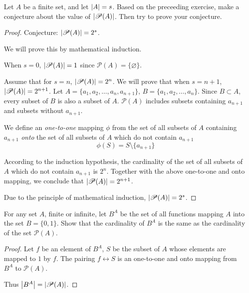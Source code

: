 \begin{exercise}
    Let $A$ be a finite set, and let $\left\vert{A}\right\vert = s$. Based on the preceeding exercise, make a conjecture about the value of $\left\vert{\mathscr{P}(A)}\right\vert$. Then try to prove your conjecture.
\end{exercise}

\begin{proof}
    Conjecture: $\left\vert{\mathscr{P}(A)}\right\vert = {2}^{s}$.

    We will prove this by mathematical induction.

    When $s = 0$, $\left\vert{\mathscr{P}(A)}\right\vert = 1$ since $\mathscr{P}(A) = \{ \varnothing \}$.

    Assume that for $s = n$, $\left\vert{\mathscr{P}(A)}\right\vert = {2}^{n}$. We will prove that when $s = n+1$, $\left\vert{\mathscr{P}(A)}\right\vert = {2}^{n+1}$. Let $A = \{ a_{1}, a_{2}, \ldots, a_{n}, a_{n+1} \}$, $B = \{ a_{1}, a_{2}, \ldots, a_{n} \}$. Since $B\subset A$, every subset of $B$ is also a subset of $A$. $\mathscr{P}(A)$ includes subsets containing $a_{n+1}$ and subsets without $a_{n+1}$.

    We define an \textit{one-to-one} mapping $\phi$ from the set of all subsets of $A$ containing $a_{n+1}$ \textit{onto} the set of all subsets of $A$ which do not contain $a_{n+1}$
    \[
        \phi(S) = S\setminus \{ a_{n+1} \}
    \]

    According to the induction hypothesis, the cardinality of the set of all subsets of $A$ which do not contain $a_{n+1}$ is ${2}^{n}$. Together with the above one-to-one and onto mapping, we conclude that $\left\vert{\mathscr{P}(A)}\right\vert = {2}^{n+1}$.

    Due to the principle of mathematical induction, $\left\vert{\mathscr{P}(A)}\right\vert = {2}^{s}$.
\end{proof}

\begin{exercise}
    For any set $A$, finite or infinite, let $B^{A}$ be the set of all functions mapping $A$ into the set $B = \{ 0, 1 \}$. Show that the cardinality of $B^{A}$ is the same as the cardinality of the set $\mathscr{P}(A)$.
\end{exercise}

\begin{proof}
    Let $f$ be an element of $B^{A}$, $S$ be the subset of $A$ whose elements are mapped to $1$ by $f$. The pairing $f\leftrightarrow S$ is an one-to-one and onto mapping from $B^{A}$ to $\mathscr{P}(A)$.

    Thus $\left\vert{B^{A}}\right\vert = \left\vert{\mathscr{P}(A)}\right\vert$.
\end{proof}

